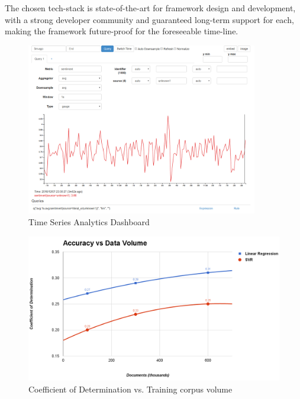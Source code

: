 \documentclass[conference]{IEEEtran}
\begin{document}
        The chosen tech-stack is state-of-the-art for framework design and development, with a strong developer community and guaranteed long-term support for each, making the framework future-proof for the foreseeable time-line.

\begin{figure}[ht] \label{fig:time-series-analytics-dashboard}
    \centering
    \includegraphics[width=0.9\textwidth]{images/bosun_dash_1.png}
    \caption{Time Series Analytics Dashboard}
\end{figure}

\begin{figure}[ht] \label{fig:accuracy-v-data}
    \centering
    \includegraphics[width=\textwidth]{images/accuracy-vs-data.png}
    \caption{Coefficient of Determination vs. Training corpus volume}
\end{figure}

\vspace{5mm}
\end{document}
